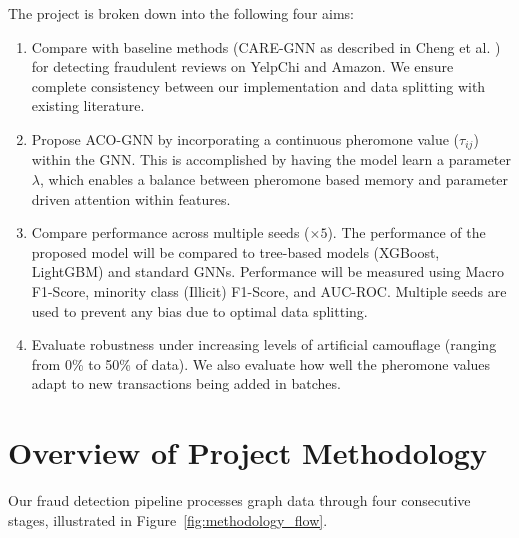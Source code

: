 The project is broken down into the following four aims:
\begin{enumerate}
    \item Compare with baseline methods (CARE-GNN \cite{dou2020enhancing} as described in Cheng et al. \cite{cheng2025graph}) for detecting fraudulent reviews on YelpChi and Amazon. We ensure complete consistency between our implementation and data splitting with existing literature.
    \item Propose ACO-GNN by incorporating a continuous pheromone value ($\tau_{ij}$) within the GNN. This is accomplished by having the model learn a parameter $\lambda$, which enables a balance between pheromone based memory and parameter driven attention within features.
    \item Compare performance across multiple seeds ($\times 5$). The performance of the proposed model will be compared to tree-based models (XGBoost, LightGBM) and standard GNNs. Performance will be measured using Macro F1-Score, minority class (Illicit) F1-Score, and AUC-ROC. Multiple seeds are used to prevent any bias due to optimal data splitting.
    \item Evaluate robustness under increasing levels of artificial camouflage (ranging from 0\% to 50\% of data). We also evaluate how well the pheromone values adapt to new transactions being added in batches.
\end{enumerate}

\section[Overview of Project Methodology]{\textbf{Overview of Project Methodology}}
\label{sec:brief_methodology}

Our fraud detection pipeline processes graph data through four consecutive stages, illustrated in Figure~\ref{fig:methodology_flow}.

